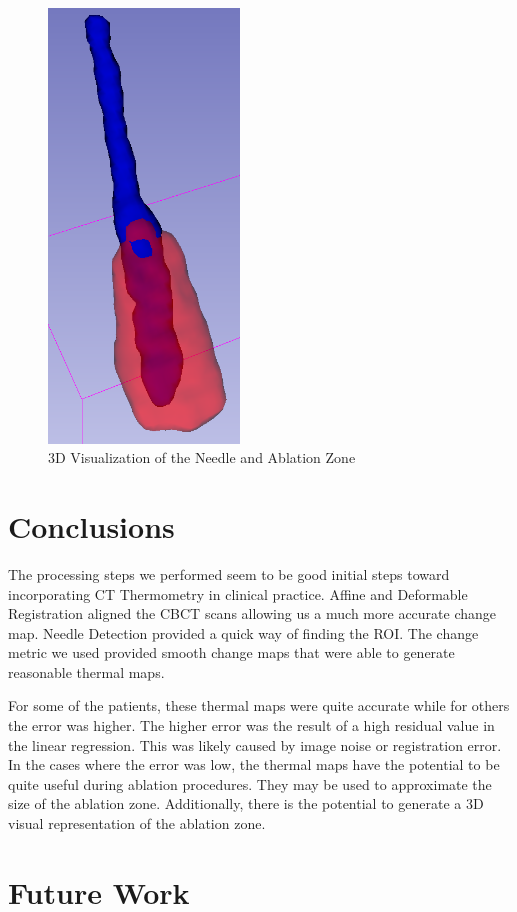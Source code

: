 \documentclass[]{spie}  %
\begin{document}
\begin{figure} 
\centering 
\includegraphics[width=2in]{NeedleAndAblationZone.png} 
\caption{3D Visualization of the Needle and Ablation Zone}
\label{needleAblationZone} 
\end{figure}

\section{Conclusions}

The processing steps we performed seem to be good initial steps toward incorporating CT Thermometry in clinical practice. Affine and Deformable Registration aligned the CBCT scans allowing us a much more accurate change map. Needle Detection provided a quick way of finding the ROI. The change metric we used provided smooth change maps that were able to generate reasonable thermal maps. 

For some of the patients, these thermal maps were quite accurate while for others the error was higher. The higher error was the result of a high residual value in the linear regression. This was likely caused by image noise or registration error. In the cases where the error was low, the thermal maps have the potential to be quite useful during ablation procedures. They may be used to approximate the size of the ablation zone. Additionally, there is the potential to generate a 3D visual representation of the ablation zone. 

\section{Future Work}
\end{document}
